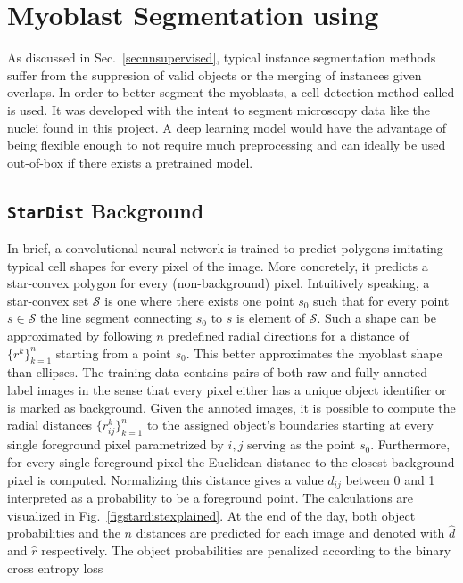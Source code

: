 \section{Myoblast Segmentation using \stardist}\label{secstardist}
As discussed in Sec.~\ref{secunsupervised}, typical instance segmentation methods suffer from the suppresion of valid objects or the merging of instances given overlaps. In order to better segment the myoblasts, a cell detection method called \stardist \cite{schmidt2018, weigert2020} is used. It was developed with the intent to segment microscopy data like the nuclei found in this project. A deep learning model would have the advantage of being flexible enough to not require much preprocessing and can ideally be used out-of-box if there exists a pretrained model.
\subsection{\texttt{StarDist} Background}
In brief, a convolutional neural network is trained to predict polygons imitating typical cell shapes for every pixel of the image. More concretely, it predicts a star-convex polygon for every (non-background) pixel. Intuitively speaking, a star-convex set $\mathcal{S}$ is one where there exists one point $s_{0}$ such that for every point $s \in \mathcal{S}$ the line segment connecting $s_{0}$ to $s$ is element of $\mathcal{S}$. Such a shape can be approximated by following $n$ predefined radial directions for a distance of $\{r^{k}\}^{n}_{k = 1}$ starting from a point $s_{0}$. This better approximates the myoblast shape than ellipses. The training data contains pairs of both raw and fully annoted label images in the sense that every pixel either has a unique object identifier or is marked as background. Given the annoted images, it is possible to compute the radial distances $\{r^{k}_{ij}\}^{n}_{k = 1}$ to the assigned object's boundaries starting at every single foreground pixel parametrized by $i, j$ serving as the point  $s_{0}$. Furthermore, for every single foreground pixel the Euclidean distance to the closest background pixel is computed. Normalizing this distance gives a value $d_{ij}$ between 0 and 1 interpreted as a probability to be a foreground point. The calculations are visualized in Fig.~\ref{figstardistexplained}. At the end of the day, both object probabilities and the $n$ distances are predicted for each image and denoted with $\hat{d}$ and $\hat{r}$ respectively. The object probabilities are penalized according to the binary cross entropy loss

